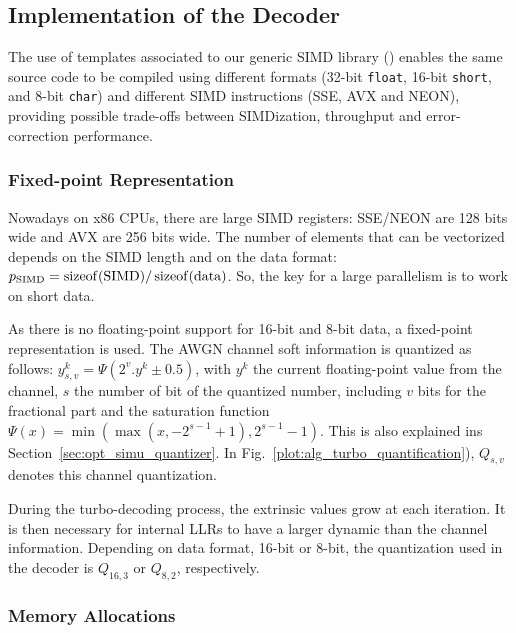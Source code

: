 \subsection{Implementation of the Decoder}
\label{sec:opt_turbo_implem}

The use of \Cxx templates associated to our generic SIMD library (\MIPP) enables
the same source code to be compiled using different formats (32-bit
\verb|float|, 16-bit \verb|short|, and 8-bit \verb|char|) and different SIMD
instructions (SSE, AVX and NEON), providing possible trade-offs between
SIMDization, throughput and error-correction performance.

\subsubsection{Fixed-point Representation}

Nowadays on x86 CPUs, there are large SIMD registers: SSE/NEON are 128 bits
wide and AVX are 256 bits wide. The number of elements that can be vectorized
depends on the SIMD length and on the data format:
$p_\text{SIMD} = \operatorname*{sizeof}(\text{SIMD}) / \operatorname*{sizeof}(\text{data})$. So, the key for a
large parallelism is to work on short data.

As there is no floating-point support for 16-bit and 8-bit data, a fixed-point
representation is used. The AWGN channel soft information is quantized as
follows: $y_{s,v}^k = \Psi(2^v . y^k \pm 0.5)$, with $y^k$ the current
floating-point value from the channel, $s$ the number of bit of the quantized
number, including $v$ bits for the fractional part and the saturation function
$\Psi(x) = \min(\max(x, -2^{s-1} +1), 2^{s-1} -1)$. This is also explained ins
Section~\ref{sec:opt_simu_quantizer}. In
Fig.~\ref{plot:alg_turbo_quantification}), $Q_{s,v}$ denotes this channel
quantization.

During the turbo-decoding process, the extrinsic values grow at each iteration.
It is then necessary for internal LLRs to have a larger dynamic than the channel
information. Depending on data format, 16-bit or 8-bit, the quantization used in
the decoder is $Q_{16,3}$ or $Q_{8,2}$, respectively.

\subsubsection{Memory Allocations}

